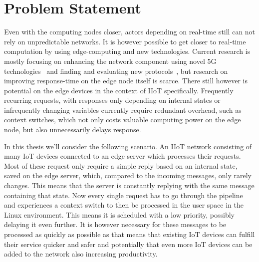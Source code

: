 \section{Problem Statement}

Even with the computing nodes closer, actors depending on real-time still can
not rely on unpredictable networks. It is however possible to get closer to
real-time computation by using edge-computing and new technologies. Current
research is mostly focusing on enhancing the network component using novel 5G
technologies~\cite{nunna_enabling_2015} and finding and evaluating new
protocols~\cite{suriyachai_survey_2012}, but research on improving response-time
on the edge node itself is scarce. There still however is potential on the edge
devices in the context of IIoT specifically. Frequently recurring requests, with
responses only depending on internal states or infrequently changing variables
currently require redundant overhead, such as context switches, which not only
costs valuable computing power on the edge node, but also unnecessarily delays
response.

In this thesis we'll consider the following scenario. An IIoT network consisting
of many IoT devices connected to an edge server which processes their requests.
Most of these request only require a simple reply based on an internal state,
saved on the edge server, which, compared to the incoming messages, only rarely
changes. This means that the server is constantly replying with the same message
containing that state. Now every single request has to go through the pipeline
and experiences a context switch to then be processed in the user space in the
Linux environment. This means it is scheduled with a low priority, possibly
delaying it even further. It is however necessary for these messages to be
processed as quickly as possible as that means that existing IoT devices can
fulfill their service quicker and safer and potentially that even more IoT
devices can be added to the network also increasing productivity.

